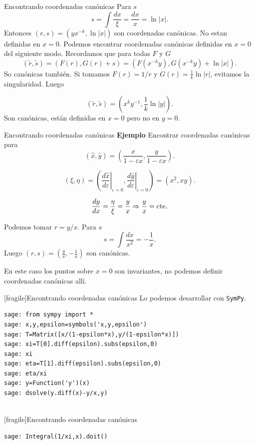 \documentclass{article}
\renewcommand{\epsilon}{\varepsilon}
\begin{document}
{Encontrando coordenadas canónicas}\label{pag_ejem_canon2}
 Para $s$
\[s=\int\frac{dx}{\xi}=\frac{dx}{x}=\ln|x|.\]
Entonces $(r,s)=(yx^{-k},\ln|x|)$ son coordenadas canónicas. No estan definidas en $x=0$.
Podemos encontrar coordenadas canónicas definidas en $x=0$ del siguiente modo. Recordamos que para todas $F$ y $G$
\[(\tilde{r},\tilde{s})=(F(r),G(r)+s)=(F(x^{-k}y),G(x^{-k}y)+\ln|x|).\]
So canónicas también. Si tomamos $F(r)=1/r$ y $G(r)=\frac{1}{k}\ln|r|$, evitamos la singularidad. Luego

\[(\tilde{r},\tilde{s})=(x^ky^{-1},\frac{1}{k}\ln|y|).\]
Son canónicas, están definidas en $x=0$ pero no en $y=0$.  









{Encontrando coordenadas canónicas}\label{pag:can_ejem_p}
\textbf{Ejemplo} Encontrar coordenadas canónicas para
\[(\hat{x},\hat{y})=\left( \frac{x}{1-\epsilon x},\frac{y}{1-\epsilon x}\right).\]

\[(\xi,\eta)=\left(\left.\frac{d\hat{x}}{d\epsilon}\right|_{\epsilon=0},\left.\frac{d\hat{y}}{d\epsilon}\right|_{\epsilon=0}\right)=(x^2,xy).\]

\[\frac{dy}{dx}=\frac{\eta}{\xi}=\frac{y}{x}\Rightarrow \frac{y}{x}=\hbox{cte}.\]

Podemos tomar $r=y/x$. Para $s$
\[s=\int\frac{dx}{x^2}=-\frac{1}{x}.\]
Luego $(r,s)=(\frac{y}{x},-\frac{1}{x})$ son canónicas.



En este caso los puntos sobre $x=0$ son invariantes, no podemos definir coordenadas canónicas allí.


 




[fragile]{Encontrando coordenadas canónicas}
Lo podemos desarrollar con \texttt{SymPy}. 
\begin{lstlisting}
sage: from sympy import *
sage: x,y,epsilon=symbols('x,y,epsilon')
sage: T=Matrix([x/(1-epsilon*x),y/(1-epsilon*x)])
sage: xi=T[0].diff(epsilon).subs(epsilon,0)
sage: xi
sage: eta=T[1].diff(epsilon).subs(epsilon,0)
sage: eta/xi
sage: y=Function('y')(x)
sage: dsolve(y.diff(x)-y/x,y)


\end{lstlisting}


[fragile]{Encontrando coordenadas canónicas}
 
\begin{lstlisting}
sage: Integral(1/xi,x).doit()

\end{lstlisting}
\end{document}
